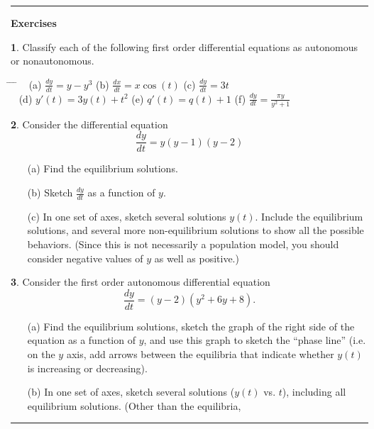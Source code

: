 \documentclass[reqno]{immbook}
\newcommand{\ds}{\displaystyle}
\numberwithin{equation}{chapter}
\numberwithin{question}{section}
\numberwithin{theorem}{chapter}
\numberwithin{figure}{chapter}
\theoremstyle{definition}
\newtheorem{exercise}{}[section]
\newenvironment{exercises}%
{%
\medskip\hrule\medskip\noindent\textbf{Exercises}%
}%
{%
\medskip\hrule
}
\begin{document}
\newpage

\begin{exercises}
\begin{exercise}
\label{ex:AutFirstOrder_autclassify}
Classify each of the following first order differential equations
as autonomous or nonautonomous.

\medskip
\begin{tabbing}
\hspace*{0.25in} \= \hspace*{1.5in} \= \hspace*{1.5in} \= \kill
~ \> 
(a) $\ds \frac{dy}{dt} = y - y^3$ \>
(b) $\ds \frac{dx}{dt} = x\cos(t)$ \>
(c) $\ds \frac{dy}{dt} = 3t$ \\[2pt]
~ \>
(d) $\ds y'(t) = 3y(t) + t^2$ \>
(e) $\ds q'(t) = q(t) + 1$ \>
(f) $\ds \frac{dy}{dt} = \frac{\pi y}{y^2+1}$
\end{tabbing}
\end{exercise}
\begin{exercise}
Consider the differential equation
\[
   \frac{dy}{dt} = y(y-1)(y-2)
\]
\begin{enumerate}
\item[(a)] Find the equilibrium solutions.\\
\item[(b)] Sketch $\frac{dy}{dt}$ as a function of $y$.\\
\item[(c)] In one set of axes, sketch several solutions $y(t)$. Include the equilibrium solutions,
and several more non-equilibrium solutions to show all the possible behaviors.
(Since this is not necessarily a population model, you should consider negative values
of $y$ as well as positive.)
\end{enumerate}
\end{exercise}
\begin{exercise}
\label{ex:AutonomousDegreeThree}
Consider the first order autonomous differential equation
\[
   \frac{dy}{dt} = (y-2)(y^2+6y+8).
\]
\begin{enumerate}
\item[(a)] Find the equilibrium solutions, 
sketch the graph  of the right side of the equation as a function
of $y$, and use this graph to sketch the ``phase line''
(i.e. on the $y$ axis, add arrows between the equilibria
that indicate whether $y(t)$ is increasing or decreasing).
\item[(b)] In one set of axes, sketch several solutions ($y(t)$ vs. $t$), including
all equilibrium solutions.
(Other than the equilibria,

\end{enumerate}
\end{exercise}
\end{exercises}
\end{document}
